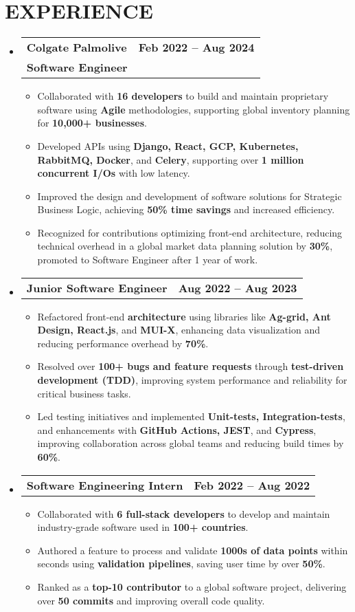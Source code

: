 \documentclass[letterpaper,10pt]{article}
\makeatletter
\newcommand{\resumeItem}[1]{
  \item\small{
    {#1 \vspace{-2pt}}
  }
}
\newcommand{\resumeSubheading}[4]{
  \vspace{2pt}\item
    \begin{tabular*}{1.0\textwidth}[t]{l@{\extracolsep{\fill}}r}
      \textbf{\large#1} & \textbf{\normalsize #2} \\
      \textbf{\normalsize#3} & \textbf{\small #4} \\
    \end{tabular*}\vspace{-7pt}
}
\newcommand{\resumeSubSubheading}[2]{
  \vspace{-6pt}\item
    \begin{tabular*}{1.0\textwidth}[t]{l@{\extracolsep{\fill}}r}
      \textbf{\normalsize#1} & \textbf{\small #2} \\
    \end{tabular*}\vspace{-7pt}
}
\newcommand{\resumeSubHeadingListStart}{\begin{itemize}[leftmargin=0.0in, label={}]}
\newcommand{\resumeSubHeadingListEnd}{\end{itemize}}
\newcommand{\resumeItemListStart}{\begin{itemize}}
\newcommand{\resumeItemListEnd}{\end{itemize}\vspace{-5pt}}
\makeatother
\begin{document}
\section{EXPERIENCE}
\resumeSubHeadingListStart
  \resumeSubheading{Colgate Palmolive 
  \href{https://drive.google.com/file/d/1Bn6h0GvFtkDxE25o8SCpva6-QOglHDiO/view?usp=drive_link}{\raisebox{-0.1\height}\faExternalLink}
  }{Feb 2022 -- Aug 2024}
  {Software Engineer}{}
  \resumeItemListStart
    \resumeItem{\normalsize{Collaborated with \textbf{16 developers} to build and maintain proprietary software using \textbf{Agile} methodologies, supporting global inventory planning for \textbf{10,000+ businesses}.}}
    \resumeItem{\normalsize{Developed APIs using \textbf{Django, React, GCP, Kubernetes, RabbitMQ, Docker}, and \textbf{Celery}, supporting over \textbf{1 million concurrent I/Os} with low latency.}}
    \resumeItem{\normalsize{Improved the design and development of software solutions for Strategic Business Logic, achieving \textbf{50\% time savings} and increased efficiency.}}
    \resumeItem{\normalsize{Recognized for contributions optimizing front-end architecture, reducing technical overhead in a global market data planning solution by \textbf{30\%}, promoted to Software Engineer after 1 year of work.}}
  \resumeItemListEnd
  \resumeSubSubheading{Junior Software Engineer}{Aug 2022 -- Aug 2023}
  \resumeItemListStart
    \resumeItem{\normalsize{Refactored front-end \textbf{architecture} using libraries like \textbf{Ag-grid, Ant Design, React.js}, and \textbf{MUI-X}, enhancing data visualization and reducing performance overhead by \textbf{70\%}.}}
    \resumeItem{\normalsize{Resolved over \textbf{100+ bugs and feature requests} through \textbf{test-driven development (TDD)}, improving system performance and reliability for critical business tasks.}}
    \resumeItem{\normalsize{Led testing initiatives and implemented \textbf{Unit-tests, Integration-tests}, and enhancements with \textbf{GitHub Actions, JEST}, and \textbf{Cypress}, improving collaboration across global teams and reducing build times by \textbf{60\%}.}}
  \resumeItemListEnd
  \resumeSubSubheading{Software Engineering Intern}{Feb 2022 -- Aug 2022}
  \resumeItemListStart
    \resumeItem{\normalsize{Collaborated with \textbf{6 full-stack developers} to develop and maintain industry-grade software used in \textbf{100+ countries}.}}
    \resumeItem{\normalsize{Authored a feature to process and validate \textbf{1000s of data points} within seconds using \textbf{validation pipelines}, saving user time by over \textbf{50\%}.}}
    \resumeItem{\normalsize{Ranked as a \textbf{top-10 contributor} to a global software project, delivering over \textbf{50 commits} and improving overall code quality.}}
  \resumeItemListEnd
\resumeSubHeadingListEnd
\vspace{-12pt}
\end{document}
